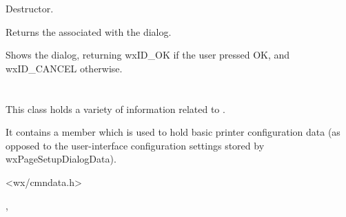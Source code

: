 \label{wxpagesetupdialogdtor}


Destructor.

\label{wxpagesetupdialoggetpagesetupdata}


Returns the  associated with the dialog.

%
%

\label{wxpagesetupdialogshowmodal}


Shows the dialog, returning wxID\_OK if the user pressed OK, and wxID\_CANCEL
otherwise.

\section{}\label{wxpagesetupdialogdata}

This class holds a variety of information related to .

It contains a  member which is used to hold basic printer configuration data (as opposed to the
user-interface configuration settings stored by wxPageSetupDialogData).




<wx/cmndata.h>


, 


\label{wxpagesetupdialogdatactor}

